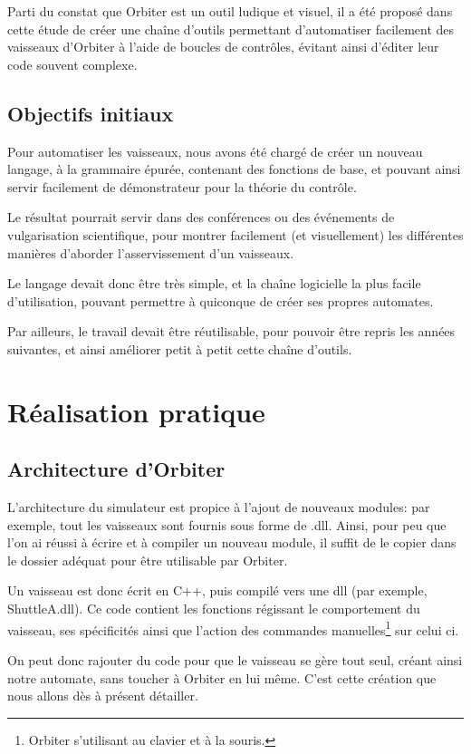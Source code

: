 \documentclass[a4paper,11pt]{article}
\begin{document}
        Parti du constat que Orbiter est un outil ludique et visuel, il a été proposé dans cette étude de créer une chaîne d'outils permettant d'automatiser facilement des vaisseaux d'Orbiter à l'aide de boucles de contrôles, évitant ainsi d'éditer leur code souvent complexe.

    \subsection{Objectifs initiaux}
        Pour automatiser les vaisseaux, nous avons été chargé de créer un nouveau langage, à la grammaire épurée, contenant des fonctions de base, et pouvant ainsi servir facilement de démonstrateur pour la théorie du contrôle.

        Le résultat pourrait servir dans des conférences ou des événements de vulgarisation scientifique, pour montrer facilement (et visuellement) les différentes manières d'aborder l'asservissement d'un vaisseaux.

        Le langage devait donc être très simple, et la chaîne logicielle la plus facile d'utilisation, pouvant permettre à quiconque de créer ses propres automates.

        Par ailleurs, le travail devait être réutilisable, pour pouvoir être repris les années suivantes, et ainsi améliorer petit à petit cette chaîne d'outils.

\section{Réalisation pratique}
    \subsection{Architecture d'Orbiter}
        L'architecture du simulateur est propice à l'ajout de nouveaux modules: par exemple, tout les vaisseaux sont fournis sous forme de .dll. Ainsi, pour peu que l'on ai réussi à écrire et à compiler un nouveau module, il suffit de le copier dans le dossier adéquat pour être utilisable par Orbiter.
        
        Un vaisseau est donc écrit en C++, puis compilé vers une dll (par exemple, ShuttleA.dll). Ce code contient les fonctions régissant le comportement du vaisseau, ses spécificités ainsi que l'action des commandes manuelles\footnote{Orbiter s'utilisant au clavier et à la souris.} sur celui ci.
        
        On peut donc rajouter du code pour que le vaisseau se gère tout seul, créant ainsi notre automate, sans toucher à Orbiter en lui même. C'est cette création que nous allons dès à présent détailler.
\end{document}

